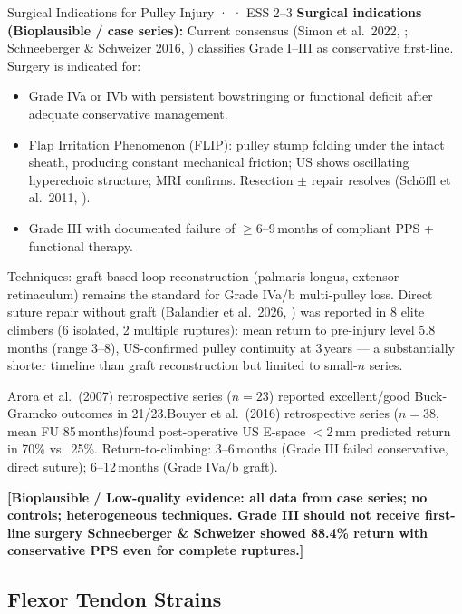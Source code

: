 \begin{bioplausbox}{Surgical Indications for Pulley Injury · \bioplausible · ESS 2--3}
\textbf{Surgical indications (Bioplausible / case series):} Current consensus (Simon et al.\ 2022, \cite{SLTS22}; Schneeberger \& Schweizer 2016, \cite{SS16}) classifies Grade I--III as conservative first-line. Surgery is indicated for:
\begin{itemize}[leftmargin=1.5em,noitemsep]
  \item Grade IVa or IVb with persistent bowstringing or functional deficit after adequate conservative management.
  \item Flap Irritation Phenomenon (FLIP): pulley stump folding under the intact sheath, producing constant mechanical friction; US shows oscillating hyperechoic structure; MRI confirms. Resection $\pm$ repair resolves (Sch\"{o}ffl et al.\ 2011, \cite{SBS11}).
  \item Grade III with documented failure of $\geq$6--9\,months of compliant PPS + functional therapy.
\end{itemize}
Techniques: graft-based loop reconstruction (palmaris longus, extensor retinaculum) remains the standard for Grade IVa/b multi-pulley loss. Direct suture repair without graft (Balandier et al.\ 2026, \cite{BBM+26}) was reported in 8 elite climbers (6 isolated, 2 multiple ruptures): mean return to pre-injury level 5.8\,months (range 3--8), US-confirmed pulley continuity at 3\,years --- a substantially shorter timeline than graft reconstruction but limited to small-$n$ series.

Arora et al.\ (2007) retrospective series ($n=23$) reported excellent/good Buck-Gramcko outcomes in 21/23.\singlesource Bouyer et al.\ (2016) retrospective series ($n=38$, mean FU 85\,months)\singlesource found post-operative US E-space $<$2\,mm predicted return in 70\% vs.\ 25\%. Return-to-climbing: 3--6\,months (Grade III failed conservative, direct suture); 6--12\,months (Grade IVa/b graft).

\textbf{[Bioplausible / Low-quality evidence: all data from case series; no controls; heterogeneous techniques. Grade III should not receive first-line surgery \textemdash{} Schneeberger \& Schweizer \cite{SS16} showed 88.4\% return with conservative PPS even for complete ruptures.]}
\end{bioplausbox}

\subsection{Flexor Tendon Strains}
\label{subsec:flexortendon}

